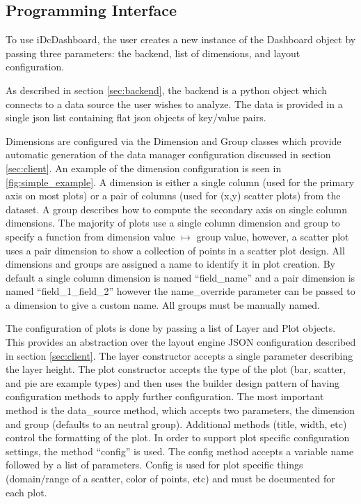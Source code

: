 \documentclass[letter,twocolumn]{article}
\begin{document}
\subsection{Programming Interface}\label{sec:api}

To use iDcDashboard, the user creates a new instance of the Dashboard object by passing three parameters: the backend, list of dimensions, and layout configuration.

As described in section \ref{sec:backend}, the backend is a python object which connects to a data source the user wishes to analyze.
The data is provided in a single json list containing flat json objects of key/value pairs.

Dimensions are configured via the Dimension and Group classes which provide automatic generation of the data manager configuration discussed in section \ref{sec:client}.
An example of the dimension configuration is seen in \ref{fig:simple_example}.
A dimension is either a single column (used for the primary axis on most plots) or a pair of columns (used for (x,y) scatter plots) from the dataset.
A group describes how to compute the secondary axis on single column dimensions.
The majority of plots use a single column dimension and group to specify a function from dimension value $\mapsto$ group value,
however, a scatter plot uses a pair dimension to show a collection of points in a scatter plot design.
All dimensions and groups are assigned a name to identify it in plot creation.
By default a single column dimension is named ``field\_name''  and a pair dimension is named ``field\_1\_field\_2'' however the name\_override parameter can be passed to a dimension to give a custom name.
All groups must be manually named.

The configuration of plots is done by passing a list of Layer and Plot objects. 
This provides an abstraction over the layout engine JSON configuration described in section \ref{sec:client}.
The layer constructor accepts a single parameter describing the layer height.
The plot constructor accepts the type of the plot (bar, scatter, and pie are example types) and then uses the builder design pattern of having configuration methods to apply further configuration.
The most important method is the data\_source method, which accepts two parameters, the dimension and group (defaults to an neutral group).
Additional methods (title, width, etc) control the formatting of the plot.
In order to support plot specific configuration settings, the method ``config'' is used.
The config method accepts a variable name followed by a list of parameters.
Config is used for plot specific things (domain/range of a scatter, color of points, etc) and must be documented for each plot.
\end{document}
